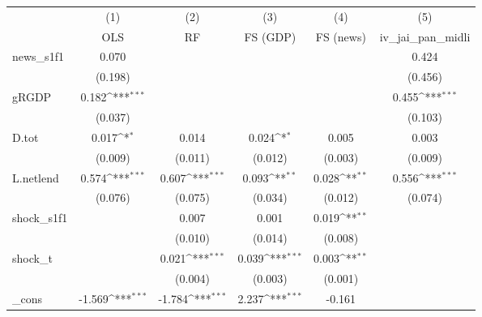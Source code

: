 {
\def\sym#1{\ifmmode^{#1}\else\(^{#1}\)\fi}
\begin{tabular}{l*{5}{c}}
\toprule
            &\multicolumn{1}{c}{(1)}&\multicolumn{1}{c}{(2)}&\multicolumn{1}{c}{(3)}&\multicolumn{1}{c}{(4)}&\multicolumn{1}{c}{(5)}\\
            &\multicolumn{1}{c}{OLS}&\multicolumn{1}{c}{RF}&\multicolumn{1}{c}{FS (GDP)}&\multicolumn{1}{c}{FS (news)}&\multicolumn{1}{c}{iv\_jai\_pan\_midli}\\
\midrule
news\_s1f1   &       0.070         &                     &                     &                     &       0.424         \\
            &     (0.198)         &                     &                     &                     &     (0.456)         \\
\addlinespace
gRGDP       &       0.182\sym{***}&                     &                     &                     &       0.455\sym{***}\\
            &     (0.037)         &                     &                     &                     &     (0.103)         \\
\addlinespace
D.tot       &       0.017\sym{*}  &       0.014         &       0.024\sym{*}  &       0.005         &       0.003         \\
            &     (0.009)         &     (0.011)         &     (0.012)         &     (0.003)         &     (0.009)         \\
\addlinespace
L.netlend   &       0.574\sym{***}&       0.607\sym{***}&       0.093\sym{**} &       0.028\sym{**} &       0.556\sym{***}\\
            &     (0.076)         &     (0.075)         &     (0.034)         &     (0.012)         &     (0.074)         \\
\addlinespace
shock\_s1f1  &                     &       0.007         &       0.001         &       0.019\sym{**} &                     \\
            &                     &     (0.010)         &     (0.014)         &     (0.008)         &                     \\
\addlinespace
shock\_t     &                     &       0.021\sym{***}&       0.039\sym{***}&       0.003\sym{**} &                     \\
            &                     &     (0.004)         &     (0.003)         &     (0.001)         &                     \\
\addlinespace
\_cons      &      -1.569\sym{***}&      -1.784\sym{***}&       2.237\sym{***}&      -0.161         &                     \\

\end{tabular}}
